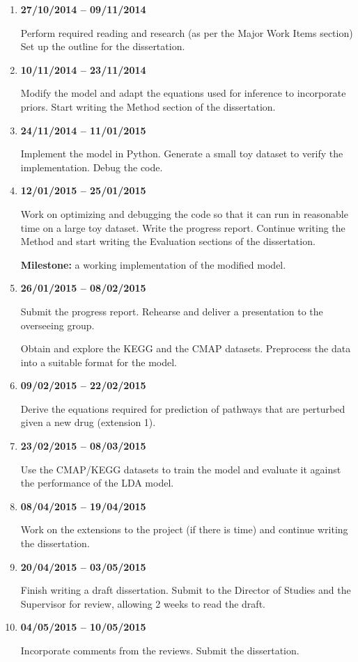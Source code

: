 \documentclass[12pt,a4]{article}
\begin{document}
\begin{enumerate}

\item {\bf 27/10/2014 -- 09/11/2014} 

Perform required reading and research (as per the Major Work Items section) Set up the outline for the dissertation.

\item {\bf 10/11/2014 -- 23/11/2014} 

Modify the model and adapt the equations used for inference to incorporate priors. Start writing the Method section of the dissertation.

\item {\bf 24/11/2014 -- 11/01/2015} 

Implement the model in Python. Generate a small toy dataset to verify the implementation. Debug the code.

\item {\bf 12/01/2015 -- 25/01/2015}

Work on optimizing and debugging the code so that it can run in reasonable time on a large toy dataset. Write the progress report. Continue writing the Method and start writing the Evaluation sections of the dissertation.

\textbf{Milestone:} a working implementation of the modified model. 

\item {\bf 26/01/2015 -- 08/02/2015} 

Submit the progress report. Rehearse and deliver a presentation to the overseeing group.

Obtain and explore the KEGG and the CMAP datasets. Preprocess the data into a suitable format for the model.

\item {\bf 09/02/2015 -- 22/02/2015}

Derive the equations required for prediction of pathways that are perturbed given a new drug (extension 1).

\item {\bf 23/02/2015 -- 08/03/2015}

Use the CMAP/KEGG datasets to train the model and evaluate it against the performance of the LDA model.

\item {\bf 08/04/2015 -- 19/04/2015}

Work on the extensions to the project (if there is time) and continue writing the dissertation.

\item {\bf 20/04/2015 -- 03/05/2015}

Finish writing a draft dissertation. Submit to the Director of Studies and the Supervisor for review, allowing 2 weeks to read the draft.

\item {\bf 04/05/2015 -- 10/05/2015}

Incorporate comments from the reviews. Submit the dissertation.

\end{enumerate}



\end{document}

